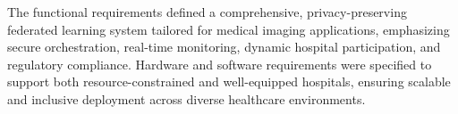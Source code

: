 The functional requirements defined a comprehensive, privacy-preserving federated learning system tailored for medical imaging applications, emphasizing secure orchestration, real-time monitoring, dynamic hospital participation, and regulatory compliance. Hardware and software requirements were specified to support both resource-constrained and well-equipped hospitals, ensuring scalable and inclusive deployment across diverse healthcare environments.
